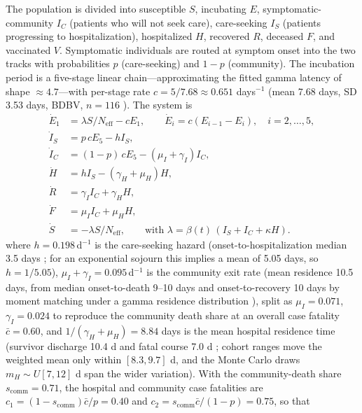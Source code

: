 \documentclass[preprint,12pt,numbers]{elsarticle}
\begin{document}
The population is divided into susceptible $S$, incubating $E$,
symptomatic-community $I_C$ (patients who will not seek care),
care-seeking $I_S$ (patients progressing to hospitalization), hospitalized
$H$, recovered $R$, deceased $F$, and vaccinated $V$. Symptomatic
individuals are routed at symptom onset into the two tracks with
probabilities $p$ (care-seeking) and $1-p$ (community). The incubation
period is a five-stage linear chain---approximating the fitted gamma
latency of shape $\approx4.7$---with per-stage rate $c=5/7.68\approx0.651$
days$^{-1}$ (mean 7.68 days, SD 3.53 days, BDBV, $n=116$
\cite{Wamala2010}). The system is
\begin{subequations}\label{eq:model}
\begin{align}
\dot E_1 &= \lambda S/N_{\mathrm{eff}} - cE_1, \qquad
\dot E_i = c(E_{i-1}-E_i),\quad i=2,\dots,5,\\
\dot I_S &= p\,cE_5 - h I_S,\\
\dot I_C &= (1-p)\,cE_5 - (\mu_I+\gamma_I) I_C,\\
\dot H   &= h I_S - (\gamma_H+\mu_H) H,\\
\dot R   &= \gamma_I I_C + \gamma_H H,\\
\dot F   &= \mu_I I_C + \mu_H H,\\
\dot S   &= -\lambda S/N_{\mathrm{eff}},
\qquad\text{with }\lambda=\beta(t)\,(I_S+I_C+\kappa H).
\end{align}
\end{subequations}
where $h=0.198\,$d$^{-1}$ is the care-seeking hazard (onset-to-hospitalization
median 3.5 days \cite{VanKerkhove2015}; for an exponential sojourn this
implies a mean of 5.05 days, so $h=1/5.05$), $\mu_I+\gamma_I=0.095\,$d$^{-1}$
is the community exit rate (mean residence 10.5 days, from median
onset-to-death 9--10 days and onset-to-recovery 10 days
\cite{VanKerkhove2015} by moment matching under a gamma residence
distribution \cite{Lloyd2001,Wallinga2007}), split as $\mu_I=0.071$,
$\gamma_I=0.024$ to reproduce the community death share at an overall
case fatality $\bar c=0.60$, and $1/(\gamma_H+\mu_H)=8.84$ days is the mean
hospital residence time (survivor discharge 10.4 d and fatal course
7.0 d \cite{WHOEbolaResponse2014,Legrand2007}; cohort ranges move the
weighted mean only within $[8.3,9.7]$ d, and the Monte Carlo draws
$m_H\sim U[7,12]$ d span the wider variation). With the community-death
share $s_{\mathrm{comm}}=0.71$, the hospital and community case
fatalities are $c_1=(1-s_{\mathrm{comm}})\bar c/p=0.40$ and
$c_2=s_{\mathrm{comm}}\bar c/(1-p)=0.75$, so that
\end{document}
